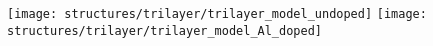 \texttt{[image: structures/trilayer/trilayer\_model\_undoped]}
\texttt{[image: structures/trilayer/trilayer\_model\_Al\_doped]}
